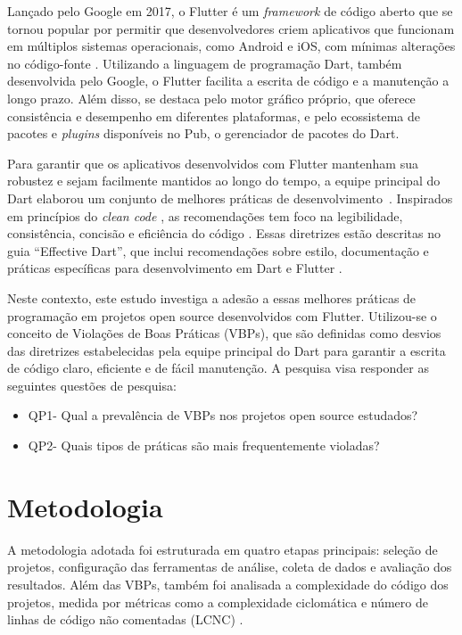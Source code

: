 \documentclass[12pt]{article}
\begin{document}
Lançado pelo Google em 2017, o Flutter é um \textit{framework} de código aberto que se tornou popular por permitir que desenvolvedores criem aplicativos que funcionam em múltiplos sistemas operacionais, como Android e iOS, com mínimas alterações no código-fonte \cite{flutter}. Utilizando a linguagem de programação Dart, também desenvolvida pelo Google, o Flutter facilita a escrita de código e a manutenção a longo prazo. Além disso, se destaca pelo motor gráfico próprio, que oferece consistência e desempenho em diferentes plataformas, e pelo ecossistema de pacotes e \textit{plugins} disponíveis no Pub, o gerenciador de pacotes do Dart.

Para garantir que os aplicativos desenvolvidos com Flutter mantenham sua robustez e sejam facilmente mantidos ao longo do tempo, a equipe principal do Dart elaborou um conjunto de melhores práticas de desenvolvimento~\cite{dartBestPractices}. Inspirados em princípios do \textit{clean code} \cite{fowler1999refactoring}, as recomendações tem foco na legibilidade, consistência, concisão e eficiência do código \cite{dartBestPractices}. Essas diretrizes estão descritas no guia ``Effective Dart'', que inclui recomendações sobre estilo, documentação e práticas específicas para desenvolvimento em Dart e Flutter \cite{dartBestPractices}.

Neste contexto, este estudo investiga a adesão a essas melhores práticas de programação em projetos open source desenvolvidos com Flutter. Utilizou-se o conceito de Violações de Boas Práticas (VBPs), que são definidas como desvios das diretrizes estabelecidas pela equipe principal do Dart para garantir a escrita de código claro, eficiente e de fácil manutenção. A pesquisa visa responder as seguintes questões de pesquisa:
\begin{itemize}    
\item QP1- Qual a prevalência de VBPs nos projetos open source estudados?
\item QP2- Quais tipos de práticas são mais frequentemente violadas?
\end{itemize}

\section{Metodologia}

A metodologia adotada foi estruturada em quatro etapas principais: seleção de projetos, configuração das ferramentas de análise, coleta de dados e avaliação dos resultados. Além das VBPs, também foi analisada a complexidade do código dos projetos, medida por métricas como a complexidade ciclomática e número de linhas de código não comentadas (LCNC) \cite{mccabe1976complexity}.
\end{document}
